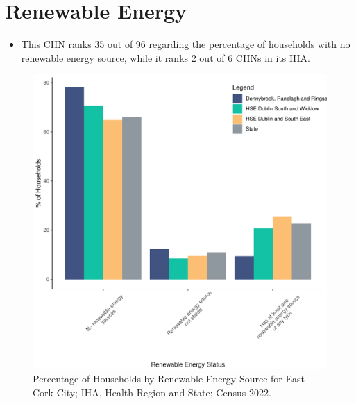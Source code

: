 \documentclass{article}
\begin{document}
\section{Renewable Energy}\label{sect:RE}
\begin{itemize}
\item This CHN ranks  35 out of 96 regarding the percentage of households with no renewable energy source, while it ranks   2 out of 6 CHNs in its IHA.
\end{itemize}
\begin{figure}[H]
	\centering
	\includegraphics[width = 140mm]{../figures/RenewableEnergyED.pdf}
	\caption{Percentage of Households by Renewable Energy Source for East Cork City; IHA, Health Region and State; Census 2022.}
	\label{fig:vbnv}
	\end{figure}
\end{document}
